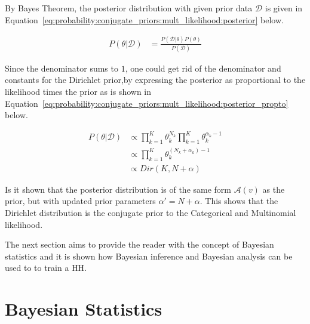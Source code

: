 By Bayes Theorem, the posterior distribution with given prior data $\mathcal{D}$ is given in Equation~\eqref{eq:probability:conjugate_priors:mult_likelihood:posterior} below.

\begin{equation}
      \label{eq:probability:conjugate_priors:mult_likelihood:posterior}
      \begin{split}
            P(\theta \vert \mathcal{D}) &= \frac{P(\mathcal{D} \vert \theta) P(\theta)}{P(\mathcal{D})}
      \end{split}
\end{equation}

Since the denominator sums to $1$, one could get rid of the denominator and constants for the Dirichlet prior,by expressing the posterior as proportional to the likelihood times the prior as is shown in Equation~\eqref{eq:probability:conjugate_priors:mult_likelihood:posterior_propto} below.

\begin{equation}
      \label{eq:probability:conjugate_priors:mult_likelihood:posterior_propto}
      \begin{split}
            P(\theta \vert \mathcal{D}) &\propto \prod_{k=1}^{K} \theta_{k}^{N_{k}} \prod_{k=1}^{K} \theta_{k}^{\alpha_{k} - 1}\\
            &\propto \prod_{k=1}^{K} \theta_{k}^{(N_{k} + \alpha_{k}) - 1} \\
            &\propto Dir(K, N + \alpha)
      \end{split}
\end{equation}

Is it shown that the posterior distribution is of the same form $\mathcal{A}(v)$ as the prior, but with updated prior parameters $\alpha' = N + \alpha$. This shows that the Dirichlet distribution is the conjugate prior to the Categorical and Multinomial likelihood.

The next section aims to provide the reader with the concept of Bayesian statistics and it is shown how Bayesian inference and Bayesian analysis can be used to to train a \ac{HH}.


\section{Bayesian Statistics}
\label{sec:probability:bayesian_statistics}

